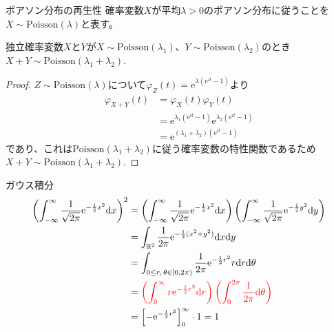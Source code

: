 \documentclass[lualatex,handout]{beamer}
\newcommand{\mycolor}[2]{%
  \begingroup
  \colorlet{currentcolor}{.}%
  \color{#1}#2%
  \color{currentcolor}%
  \endgroup
}
\newcommand{\emm}[1]{\mycolor{red}{#1}}
\theoremstyle{definition}
\begin{document}
\begin{frame}{ポアソン分布の再生性}
確率変数$X$が平均$\lambda>0$のポアソン分布に従うことを$X\sim\mathrm{Poisson}(\lambda)$と表す。
\begin{lemma}
独立確率変数$X$と$Y$が$X\sim\mathrm{Poisson}(\lambda_1)$、$Y\sim\mathrm{Poisson}(\lambda_2)$のとき
$X+Y\sim\mathrm{Poisson}(\lambda_1+\lambda_2)$.
\end{lemma}
\begin{proof}
$Z\sim\mathrm{Poisson}(\lambda)$について$\varphi_Z(t)=\mathrm{e}^{\lambda(\mathrm{e}^{it}-1)}$より
\begin{align*}
\varphi_{X+Y}(t) &= \varphi_X(t)\varphi_Y(t)\\
&=\mathrm{e}^{\lambda_1(\mathrm{e}^{it}-1)}\mathrm{e}^{\lambda_2(\mathrm{e}^{it}-1)}\\
&=\mathrm{e}^{(\lambda_1+\lambda_2)(\mathrm{e}^{it}-1)}
\end{align*}
であり、これは$\mathrm{Poisson}(\lambda_1+\lambda_2)$に従う確率変数の特性関数であるため$X+Y\sim\mathrm{Poisson}(\lambda_1+\lambda_2)$.
\end{proof}
\end{frame}

\begin{frame}{ガウス積分}
\begin{align*}
\left(\int_{-\infty}^\infty \frac1{\sqrt{2\pi}}\mathrm{e}^{-\frac12x^2}\mathrm{d}x\right)^2
&=
\left(\int_{-\infty}^\infty \frac1{\sqrt{2\pi}}\mathrm{e}^{-\frac12x^2}\mathrm{d}x\right)
\left(\int_{-\infty}^\infty \frac1{\sqrt{2\pi}}\mathrm{e}^{-\frac12y^2}\mathrm{d}y\right)\\
&=
\int_{\mathbb{R}^2} \frac1{2\pi}\mathrm{e}^{-\frac12(x^2+y^2)}\mathrm{d}x\mathrm{d}y\\
&=
\int_{0\le r,\, \theta\in[0,2\pi)} \frac1{2\pi}\mathrm{e}^{-\frac12r^2}r\mathrm{d}r\mathrm{d}\theta\\
&=
\emm{
\left(\int_{0}^\infty r\mathrm{e}^{-\frac12r^2}\mathrm{d}r\right)
\left(\int_0^{2\pi} \frac1{2\pi}\mathrm{d}\theta\right)}\\
&=\left[-\mathrm{e}^{-\frac12r^2}\right]_0^\infty\cdot 1 = 1
\end{align*}
\end{frame}
\end{document}
